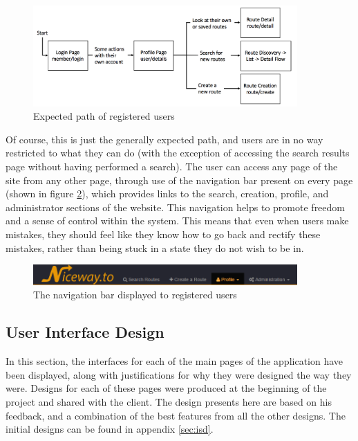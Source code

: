 \begin{figure}[!ht]
	\vspace{-3mm}
	\begin{center}
		\includegraphics[width=0.9\textwidth]{images/design/user_flow.png}
	\end{center}
	\vspace{-6mm}
	\caption{Expected path of registered users}
	\label{fig:user_flow}
\end{figure}

\noindent
Of course, this is just the generally expected path, and users are in no way restricted to what they can do (with the exception of accessing the search results page without having performed a search). The user can access any page of the site from any other page, through use of the navigation bar present on every page (shown in figure \ref{fig:navbar}), which provides links to the search, creation, profile, and administrator sections of the website. This navigation helps to promote freedom and a sense of control within the system. This means that even when users make mistakes, they should feel like they know how to go back and rectify these mistakes, rather than being stuck in a state they do not wish to be in.

\begin{figure}[!ht]
	\begin{center}
		\includegraphics[width=0.9\textwidth]{images/design/navbar.png}
	\end{center}
	\vspace{-6mm}
	\caption{The navigation bar displayed to registered users}
	\label{fig:navbar}
\end{figure}

\subsection{User Interface Design}
In this section, the interfaces for each of the main pages of the application have been displayed, along with justifications for why they were designed the way they were. Designs for each of these pages were produced at the beginning of the project and shared with the client. The design presents here are based on his feedback, and a combination of the best features from all the other designs. The initial designs can be found in appendix \ref{sec:isd}.

